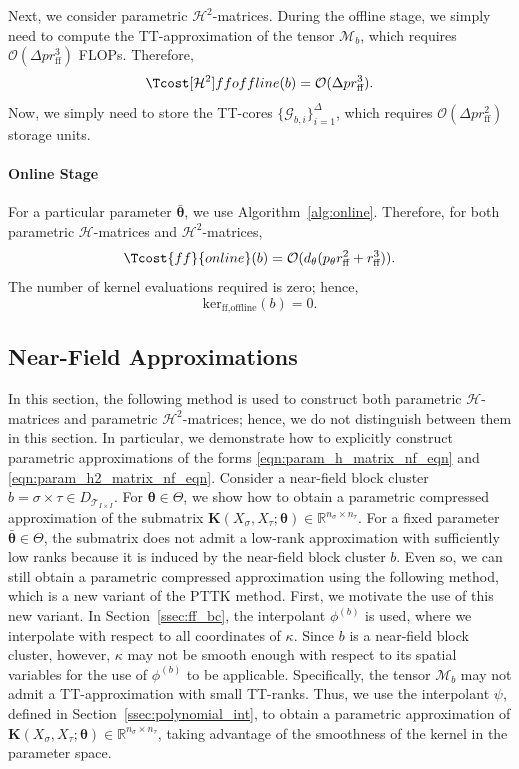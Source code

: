 \documentclass[final,3p,times]{elsarticle}
\newcommand{\mc}[1]{\mathcal{#1}}
\renewcommand{\vec}[1]{\boldsymbol{#1}}
\newcommand{\mat}[1]{\boldsymbol{#1}}
\newcommand{\R}{\mathbb{R}}
\newcommand{\ten}[1]{\boldsymbol{\mathcal{#1}}}
\begin{document}
Next, we consider parametric $\mc{H}^{2}$-matrices. During the offline stage, we simply need to compute the TT-approximation of the tensor $\ten{M}_{b}$, which requires $\mc{O}(\Delta pr_{\text{ff}}^3)$ FLOPs. Therefore,
\begin{equation}\label{ceqn:H2_ff_offline}
 \Tcost[\mc{H}^{2}]{ff}{offline}(b) = \mc{O}(\Delta pr_{\text{ff}}^3 ).
\end{equation}
Now, we simply need to store the TT-cores $\{\ten{G}_{b, i} \}_{i= 1}^{\Delta}$, which requires $\mc{O}(\Delta pr_{\text{ff}}^2)$ storage units. 


\paragraph{Online Stage}
For a particular parameter $\bar{\vec{\theta}}$, we  use Algorithm~\ref{alg:online}. Therefore, for both parametric $\mc{H}$-matrices and $\mc{H}^{2}$-matrices,
\begin{equation}\label{ceqn:ff_online}
 \Tcost{ff}{online}(b) = \mc{O}(d_{\theta}(p_{\theta}r_{\text{ff}}^2 + r_{\text{ff}}^3)).
 \end{equation}
 The number of kernel evaluations required is zero; hence, 
 $$\text{ker}_{\text{ff}, \text{offline}}(b) = 0.$$


\subsection{Near-Field Approximations}\label{ssec:nf_bc}
In this section, the following method is used to construct both parametric $\mc{H}$-matrices and parametric $\mc{H}^{2}$-matrices; hence, we do not distinguish between them in this section.
In particular, we demonstrate how to explicitly construct parametric approximations of the forms \eqref{eqn:param_h_matrix_nf_eqn} and \eqref{eqn:param_h2_matrix_nf_eqn}. Consider a near-field block cluster $b =\sigma \times \tau \in D_{\mc{T}_{I \times I}}$. For $\vec{\theta} \in \Theta$, we show how to obtain a parametric compressed approximation of the submatrix $\mat{K}({X}_{\sigma}, {X}_{\tau};\vec{\theta}) \in \R^{n_{\sigma} \times n_{\tau}}$.
For a fixed parameter $\bar{\vec{\theta}} \in \Theta$, the submatrix does not admit a low-rank approximation with sufficiently low ranks because it is induced by the near-field block cluster $b$. 
Even so, we can still obtain a parametric compressed approximation using the following method, which is a new variant of the PTTK method. First, we motivate the use of this new variant. In  Section~\ref{ssec:ff_bc},  the interpolant $\phi^{(b)}$ is used, where we interpolate with respect to all coordinates of $\kappa$. Since $b$ is a near-field block cluster, however, $\kappa$ may not be smooth enough with respect to its spatial variables for the use of $\phi^{(b)}$ to be applicable.  Specifically, the tensor $\ten{M}_{b}$ may not admit a TT-approximation with small TT-ranks. Thus, we use the interpolant $\psi$, defined in Section~\ref{ssec:polynomial_int},  to obtain a parametric approximation of $\mat{K}({X}_{\sigma}, {X}_{\tau};\vec{\theta}) \in \R^{n_{\sigma} \times n_{\tau}}$, taking advantage of the smoothness of the kernel in the parameter space. 
\end{document}
